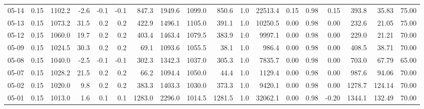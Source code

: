 \begin{threeparttable}
{\begin{tabular}{lrrrrrrrrrrrrrrrrr}
  05-14 &     0.15 & 1102.2 &              -2.6 &              -0.1 &               -0.1 &              847.3 & 1949.6 & 1099.0 &      850.6 &                      1.0 &             22513.4 &       0.15 &      0.98 &           0.15 &            393.8 &           35.83 &                  75.00 \\
  05-13 &     0.15 & 1073.2 &              31.5 &               0.2 &                0.2 &              422.9 & 1496.1 & 1105.0 &      391.1 &                      1.0 &             10250.5 &       0.00 &      0.98 &           0.00 &            232.6 &           21.05 &                  75.00 \\
  05-12 &     0.15 & 1060.0 &              19.7 &               0.2 &                0.2 &              403.4 & 1463.4 & 1079.5 &      383.9 &                      1.0 &              9997.1 &       0.00 &      0.98 &           0.00 &            229.0 &           21.21 &                  70.00 \\
  05-09 &     0.15 & 1024.5 &              30.3 &               0.2 &                0.2 &               69.1 & 1093.6 & 1055.5 &       38.1 &                      1.0 &               986.4 &       0.00 &      0.98 &           0.00 &            408.5 &           38.71 &                  70.00 \\
  05-08 &     0.15 & 1040.0 &              -2.5 &              -0.1 &               -0.1 &              302.3 & 1342.3 & 1037.0 &      305.3 &                      1.0 &              7835.7 &       0.00 &      0.98 &           0.00 &            703.0 &           67.79 &                  65.00 \\
  05-07 &     0.15 & 1028.2 &              21.5 &               0.2 &                0.2 &               66.2 & 1094.4 & 1050.0 &       44.4 &                      1.0 &              1129.4 &       0.00 &      0.98 &           0.00 &            987.6 &           94.06 &                  70.00 \\
  05-02 &     0.15 & 1020.0 &               9.8 &               0.2 &                0.2 &              383.3 & 1403.3 & 1030.0 &      373.3 &                      1.0 &              9420.1 &       0.00 &      0.98 &           0.00 &           1278.7 &          124.14 &                  70.00 \\
  05-01 &     0.15 & 1013.0 &               1.6 &               0.1 &                0.1 &             1283.0 & 2296.0 & 1014.5 &     1281.5 &                      1.0 &             32062.1 &       0.00 &      0.98 &          -0.20 &           1344.1 &          132.49 &                  70.00 \\

\end{tabular}}
\end{threeparttable}
